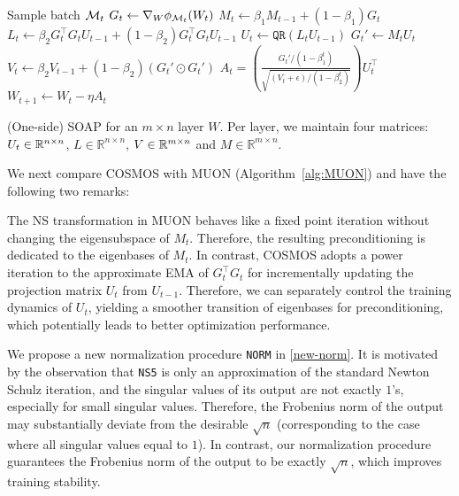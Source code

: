 \begin{algorithm}[htb!]
	\begin{algorithmic}[1]
		\STATE Sample batch $\mathcal{M}_t$
		\STATE $G_t \gets \nabla_W \phi_{\mathcal{M}_t}(W_t)$
        \STATE $M_t \gets \beta_1M_{t-1}+(1-\beta_1)G_t$
        \STATE $L_t \gets \beta_2G_t^\top G_tU_{t-1}+(1-\beta_2)G_t^\top G_tU_{t-1}$
        \STATE $U_t \gets \texttt{QR}(L_tU_{t-1})$
        \STATE $G_t' \gets M_tU_t$
		\STATE $V_t \gets \beta_2 V_{t-1} + (1-\beta_2) (G_t' \odot G_t')$
		\STATE $\displaystyle A_t = \left(\frac{G_t'/(1-\beta_1^t)}{\sqrt{(V_t+\epsilon)/(1-\beta_2^t)}}\right)U_t^\top$
        \STATE $\displaystyle W_{t+1} \gets W_{t} -\eta A_t$
        \ENDFOR
	\end{algorithmic}
	\caption{(One-side) SOAP for an $m \times n$ layer $W$. Per layer, we maintain four matrices: $U_t\in\mathbb{R}^{n\times n}$, $L \in \mathbb{R}^{n \times n}$, $V\in\mathbb{R}^{m\times n}$ and $M \in \mathbb{R}^{m \times n}$.}
	\label{alg:SOAP}
\end{algorithm}

We next compare COSMOS with MUON (Algorithm~\ref{alg:MUON}) and have the following two remarks:

\begin{remark} The NS transformation in MUON behaves like a fixed point iteration without changing the eigensubspace of $M_t$. Therefore, the resulting preconditioning is dedicated to the eigenbases of $M_t$. In contrast, COSMOS adopts a power iteration to the approximate EMA of $G_t^\top G_t$ for incrementally updating the projection matrix $U_t$ from $U_{t-1}$. Therefore, we can separately control the training dynamics of $U_t$, yielding a smoother transition of eigenbases for preconditioning, which potentially leads to better optimization performance.
\end{remark}

\begin{remark}  We propose a new normalization procedure \texttt{NORM} in \eqref{new-norm}. It is motivated by the observation that \texttt{NS5} is only an approximation of the standard Newton Schulz iteration, and the singular values of its output are not exactly $1$'s, especially for small singular values. Therefore, the Frobenius norm of the output may substantially deviate from the desirable $\sqrt{n}$ (corresponding to the case where all singular values equal to $1$). In contrast, our normalization procedure guarantees the Frobenius norm of the output to be exactly $\sqrt{n}$, which improves training stability.
\end{remark}

